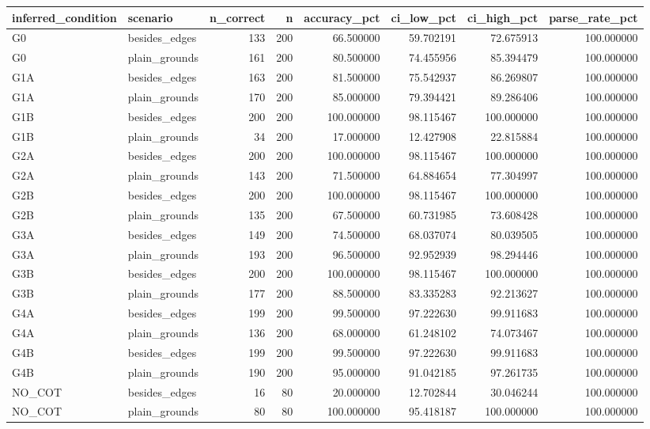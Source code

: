 \begin{tabular}{llrrrrrr}
\toprule
inferred_condition & scenario & n_correct & n & accuracy_pct & ci_low_pct & ci_high_pct & parse_rate_pct \\
\midrule
G0 & besides_edges & 133 & 200 & 66.500000 & 59.702191 & 72.675913 & 100.000000 \\
G0 & plain_grounds & 161 & 200 & 80.500000 & 74.455956 & 85.394479 & 100.000000 \\
G1A & besides_edges & 163 & 200 & 81.500000 & 75.542937 & 86.269807 & 100.000000 \\
G1A & plain_grounds & 170 & 200 & 85.000000 & 79.394421 & 89.286406 & 100.000000 \\
G1B & besides_edges & 200 & 200 & 100.000000 & 98.115467 & 100.000000 & 100.000000 \\
G1B & plain_grounds & 34 & 200 & 17.000000 & 12.427908 & 22.815884 & 100.000000 \\
G2A & besides_edges & 200 & 200 & 100.000000 & 98.115467 & 100.000000 & 100.000000 \\
G2A & plain_grounds & 143 & 200 & 71.500000 & 64.884654 & 77.304997 & 100.000000 \\
G2B & besides_edges & 200 & 200 & 100.000000 & 98.115467 & 100.000000 & 100.000000 \\
G2B & plain_grounds & 135 & 200 & 67.500000 & 60.731985 & 73.608428 & 100.000000 \\
G3A & besides_edges & 149 & 200 & 74.500000 & 68.037074 & 80.039505 & 100.000000 \\
G3A & plain_grounds & 193 & 200 & 96.500000 & 92.952939 & 98.294446 & 100.000000 \\
G3B & besides_edges & 200 & 200 & 100.000000 & 98.115467 & 100.000000 & 100.000000 \\
G3B & plain_grounds & 177 & 200 & 88.500000 & 83.335283 & 92.213627 & 100.000000 \\
G4A & besides_edges & 199 & 200 & 99.500000 & 97.222630 & 99.911683 & 100.000000 \\
G4A & plain_grounds & 136 & 200 & 68.000000 & 61.248102 & 74.073467 & 100.000000 \\
G4B & besides_edges & 199 & 200 & 99.500000 & 97.222630 & 99.911683 & 100.000000 \\
G4B & plain_grounds & 190 & 200 & 95.000000 & 91.042185 & 97.261735 & 100.000000 \\
NO_COT & besides_edges & 16 & 80 & 20.000000 & 12.702844 & 30.046244 & 100.000000 \\
NO_COT & plain_grounds & 80 & 80 & 100.000000 & 95.418187 & 100.000000 & 100.000000 \\
\bottomrule
\end{tabular}
